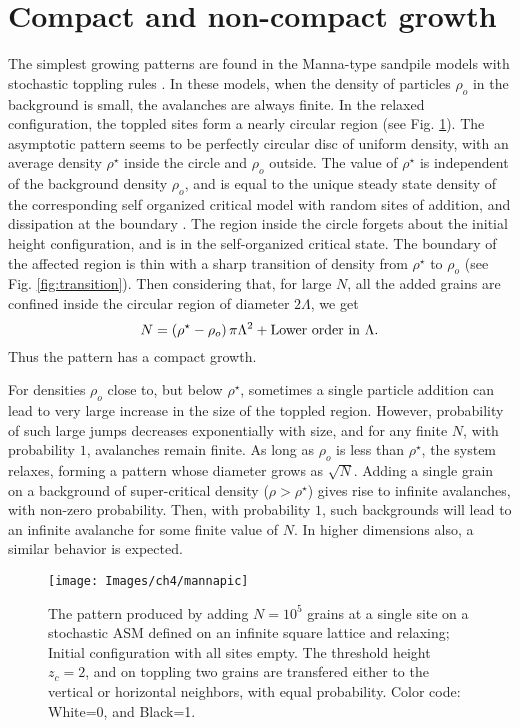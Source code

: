 \documentclass[11pt,a4paper]{book}
\begin{document}
\section{Compact and non-compact growth}\label{sec:cnc}
The simplest growing patterns are found in the  Manna-type sandpile
models with stochastic toppling rules \cite{sasm}. In these models, when the
density of particles $\rho_{o}$ in the background is small,
the avalanches are always finite. In the relaxed configuration, the
toppled sites form a nearly circular region (see Fig.
\ref{fig:mannapattern}). The asymptotic pattern seems to be perfectly
circular disc of uniform density, with an average density $\rho^\star$
inside the circle and $\rho_{o}$ outside. The value of $\rho^\star$ is
independent of the background density $\rho_{o}$, and is equal to the
unique steady state density of the corresponding self organized
critical model with random sites of addition, and dissipation at the
boundary \cite{sasm}. The region inside the circle forgets about the
initial height configuration, and is in the self-organized critical
state. The boundary of the affected region is thin with a sharp
transition of density from $\rho^\star$ to $\rho_{o}$ (see Fig. \ref{fig:transition}). Then considering
that, for large $N$, all the added grains are confined inside the
circular region of diameter $2\Lambda$, we get
\begin{equation}
N=\left( \rho^\star-\rho_{o} \right)\pi \Lambda^{2}+\rm{Lower~ order~
in~}\Lambda.
\label{eq1}
\end{equation}
Thus the pattern has a compact growth.

For densities $\rho_{o}$ close to, but below  $\rho^\star$, sometimes a
single particle addition can lead to very large increase in the size of the toppled region. However,
probability of such large jumps decreases exponentially with size, and
for any finite $N$, with probability $1$, avalanches remain finite. As
long as $\rho_{o}$ is less than $\rho^\star$, the system relaxes, forming a
pattern whose diameter grows as $\sqrt{N}$. Adding a single grain on a
background of super-critical density ($\rho > \rho^\star$) gives rise to infinite
avalanches, with non-zero probability. Then, with probability
$1$, such backgrounds will lead to an infinite avalanche for some
finite value of $N$.
In higher dimensions also, a similar  behavior is expected.
\begin{figure}
\begin{center}
\texttt{[image: Images/ch4/mannapic]}
\caption{The pattern produced by adding $N=10^5$ grains at a single site on a
stochastic ASM defined on an infinite square lattice and relaxing; Initial
configuration with all sites empty. The
threshold height $z_{c}=2$, and on toppling two grains are transfered
either to the vertical or horizontal neighbors, with equal
probability. Color code: White=0, and Black=1.}
\label{fig:mannapattern}
\end{center}
\end{figure}
\end{document}
